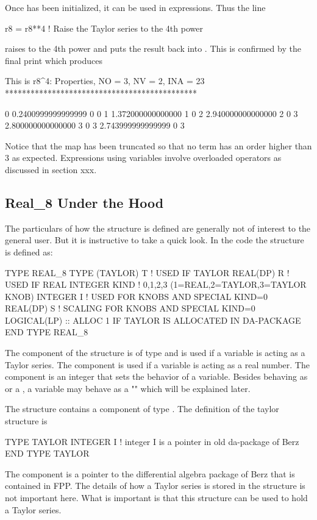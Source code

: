 \documentclass[english,12pt,article]{article} %
\begin{document}
Once  has been initialized, it can be used in expressions. Thus the line
\begin{example}
  r8 = r8**4  ! Raise the Taylor series to the 4th power
\end{example}
raises  to the 4th power and puts the result back into . This is confirmed by the final print which produces
\begin{example}
  This is r8^4:
  Properties, NO =    3, NV =    2, INA =   23
  *********************************************

    0  0.2400999999999999       0  0
    1   1.372000000000000       1  0
    2   2.940000000000000       2  0
    3   2.800000000000000       3  0
    3   2.743999999999999       0  3
\end{example}
Notice that the map has been truncated so that no term has an order higher than 3 as expected. Expressions using  variables involve overloaded operators as discussed in section xxx.

\subsection{Real\_8 Under the Hood}

The particulars of how the  structure is defined are generally not of interest to the general user. But it is instructive to take a quick look. In the  code the  structure is defined as:
\begin{example1}
  TYPE REAL_8
     TYPE (TAYLOR) T      !  USED IF TAYLOR
     REAL(DP) R           !    USED IF REAL
     INTEGER KIND  !  0,1,2,3 (1=REAL,2=TAYLOR,3=TAYLOR KNOB)
     INTEGER I   !   USED FOR KNOBS AND SPECIAL KIND=0
     REAL(DP) S   !   SCALING FOR KNOBS AND SPECIAL KIND=0
     LOGICAL(LP) :: ALLOC  1 IF TAYLOR IS ALLOCATED IN DA-PACKAGE
  END TYPE REAL_8
\end{example1}
The  component of the structure is of type  and is used if a  variable is acting as a Taylor series. The  component is used if a  variable is acting as a real number. The  component is an integer that sets the behavior of a  variable. Besides behaving as  or a , a  variable may behave as a "" which will be explained later.

The  structure contains a component of type . The definition of the taylor structure is
\begin{example1}
  TYPE TAYLOR
     INTEGER I       !  integer I is a pointer in old da-package of Berz
  END TYPE TAYLOR
\end{example1}
The component  is a pointer to the differential algebra package of Berz that is contained in FPP. The details of how a Taylor series is stored in the structure is not important here. What is important is that this structure can be used to hold a Taylor series.


\end{document}
